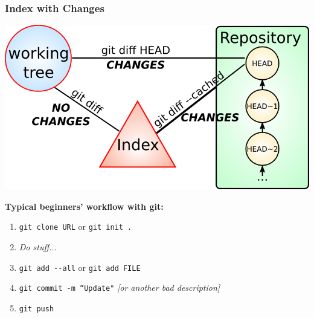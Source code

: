 \begin{frame}
  \frametitle{Index with Changes}

  \begin{center}
    \includegraphics[width=1.0\textwidth]{images/git-diff-cached-changes.png}
  \end{center}
\end{frame}


\begin{frame}

  \textbf{Typical beginners' workflow with git:\\}

  \begin{enumerate}
    \item \texttt{git clone URL} or \texttt{git init .}
    \item \textit{Do stuff...}
    \item \texttt{git add -{}-all} or \texttt{git add FILE}
    \item \texttt{git commit -m ``Update"} \textit{[or another bad description]}
    \item \texttt{git push}
  \end{enumerate}
\end{frame}


{
\begin{frame}[plain]
\end{frame}
}

